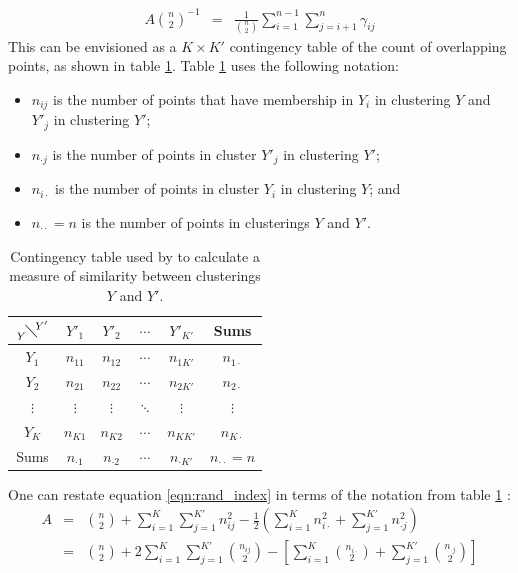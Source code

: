 \documentclass[12pt]{article} %
\begin{document}
\begin{eqnarray} \label{eqn:rand_index}
A \binom{n}{2}^{-1} & = & \frac{1}{\binom{n}{2}} \sum_{i=1}^{n-1}\sum_{j=i + 1}^n\gamma_{ij} 
\end{eqnarray}
This can be envisioned as a $K \times K'$ contingency table of the count of overlapping points, as shown in table \ref{table:rand_contingency}. Table \ref{table:rand_contingency} uses the following notation:
\begin{itemize}
	\item $n_{ij}$ is the number of points that have membership in $Y_i$ in clustering $Y$ and $Y'_j$ in clustering $Y'$;
	\item $n_{\cdot j}$ is the number of points in cluster $Y'_j$ in clustering $Y'$;
	\item $n_{i \cdot}$ is the number of points in cluster $Y_i$ in clustering $Y$; and
	\item $n_{\cdot \cdot} = n$ is the number of points in clusterings $Y$ and $Y'$.
\end{itemize}
\begin{table}[] 
	\centering
	\begin{tabular}{c|cccc|c} 
		$ {{} \atop Y}  \!\diagdown\! ^{Y'}$	& $Y'_1$	& $Y'_2$	& $\cdots$	& $Y'_{K'}$	& Sums	\\ 
		\hline
		$Y_1$		& $n_{11}$	& $n_{12}$	& $\cdots$	& $n_{1K'}$	& $n_{1 \cdot}$	\\
		$Y_2$		& $n_{21}$	& $n_{22}$	& $\cdots$	& $n_{2K'}$	& $n_{2 \cdot}$	\\
		$\vdots$	& $\vdots$	& $\vdots$	& $\ddots$	& $\vdots$	& $\vdots$		 \\
		$Y_{K}$	& $n_{K1}$	& $n_{K2}$	& $\cdots$	& $n_{KK'}$	& $n_{K \cdot}$	\\ 
		\hline
		Sums	& $n_{\cdot 1}$	&  $n_{\cdot 2}$	& $\cdots$	& $n_{\cdot K'}$	& $n_{\cdot \cdot} = n$         
	\end{tabular}
	\caption{Contingency table used by \citet{RandObjectiveCriteriaEvaluation1971} to calculate a measure of similarity between clusterings $Y$ and $Y'$.}
	\label{table:rand_contingency}
\end{table}
One can restate equation \ref{eqn:rand_index} in terms of the notation from table \ref{table:rand_contingency} \cite{BrennanMeasuringagreementwhen1974}:
\begin{eqnarray} \label{eqn:rand_index_alternative}
A &=& \binom{n}{2} + \sum_{i=1}^K\sum_{j=1}^{K'}n_{ij}^2 - \frac{1}{2}\left(\sum_{i=1}^K n_{i\cdot}^2 + \sum_{j=1}^{K'}n_{\cdot j}^2  \right) \\
&=& \binom{n}{2} + 2 \sum_{i=1}^{K}\sum_{j=1}^{K'}\binom{n_{ij}}{2} - \left[\sum_{i=1}^{K}\binom{n_{i \cdot}}{2} + \sum_{j=1}^{K'}\binom{n_{\cdot j}}{2}\right]%
\end{eqnarray}
\end{document}
